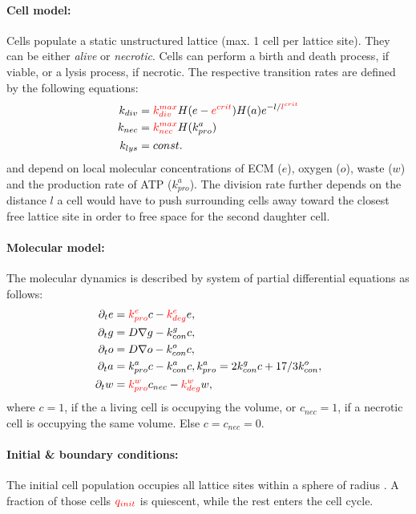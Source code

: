 \documentclass[10pt,letterpaper]{article}
\begin{document}
\paragraph{Cell model:} Cells populate a static unstructured lattice (max. 1 cell per lattice site). They can be either \emph{alive} or \emph{necrotic}. Cells can perform a birth and death process, if viable, or a lysis process, if necrotic. The respective transition rates are defined by the following equations:
\begin{align}
	k_{div}  &= {\color{red}{k_{div}^{max}}} H(e-{\color{red}{e^{crit}}}) H(a) e^{-l/{\color{red}{l^{crit}}}}\\
	k_{nec} &= {\color{red}{k_{nec}^{max}}} H(k^{a}_{pro})\\
	k_{lys} &= const.
\end{align}
and depend on local molecular concentrations of ECM ($e$), oxygen ($o$), waste ($w$) and the production rate of ATP ($k^{a}_{pro}$). The division rate further depends on the distance $l$ a cell would have to push surrounding cells away toward the closest free lattice site in order to free space for the second daughter cell.

\paragraph{Molecular model:} The molecular dynamics is described by system of partial differential equations as follows:
\begin{align}
	\partial_{t} e &= {\color{red}{k^{e}_{pro}}} c - {\color{red}{k^{e}_{deg}}} e,\\
	\partial_{t} g &= D \nabla g - k^{g}_{con} c,\\
	\partial_{t} o &= D \nabla o - k^{o}_{con} c,\\
	\partial_{t} a &=k^{a}_{pro}c - k^{a}_{con} c, k^{a}_{pro} =  2k^{g}_{con} c + 17/3 k^{o}_{con},\\
	\partial_{t} w &= {\color{red}{k^{w}_{pro}}} c_{nec} - {\color{red}{k^{w}_{deg}}} w,\\
\end{align}
where $c=1$, if the a living cell is occupying the volume, or $c_{nec}=1$, if a necrotic cell is occupying the same volume. Else $c=c_{nec}=0$.

\paragraph{Initial \& boundary conditions:}
The initial cell population occupies all lattice sites within a sphere of radius {}. A fraction of those cells $\color{red}{q_{init}}$ is quiescent, while the rest enters the cell cycle.
\end{document}
